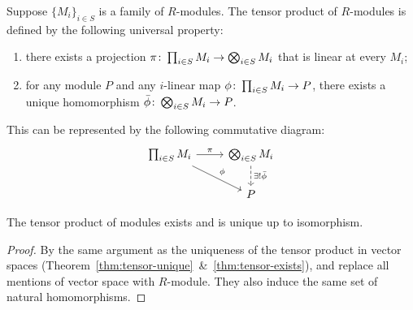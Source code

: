 \begin{definition}
    Suppose \({\{M_i\}}_{i \in S}\) is a family of \(R\)-modules.
    The tensor product of \(R\)-modules is defined by the following universal property:
    \begin{enumerate}[label={(\roman*)}, itemsep=0mm]
        \item there exists a projection \(\pi\colon\prod_{i \in S} M_i\to\bigotimes_{i \in S} M_i\)
            that is linear at every \(M_i\);
        \item for any module \(P\) and any \(i\)-linear map \(\phi\colon\prod_{i \in S} M_i\to P\),
            there exists a unique homomorphism \(\bar{\phi}\colon\bigotimes_{i \in S} M_i\to P\).
    \end{enumerate}

    This can be represented by the following commutative diagram:
    \begin{equation*}
        \begin{tikzcd}
            \prod_{i \in S} M_i \arrow{r}{\pi} \arrow{dr}{\phi} &
            \bigotimes_{i \in S} M_i \arrow[dashrightarrow]{d}{\exists!\bar{\phi}} \\
            & P
        \end{tikzcd}
    \end{equation*}
\end{definition}
\begin{theorem}
    The tensor product of modules exists and is unique up to isomorphism.
\end{theorem}
\begin{proof}
    By the same argument as the uniqueness of the tensor product in vector spaces
    (Theorem~\ref{thm:tensor-unique}~\&~\ref{thm:tensor-exists}),
    and replace all mentions of vector space with \(R\)-module.
    They also induce the same set of natural homomorphisms.
\end{proof}

